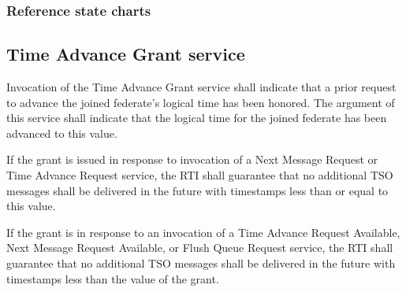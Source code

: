 \begin{compactstdpage}
    \subsubsection{Reference state charts}


    \subsection{Time Advance Grant \rtiinitiated{} service}

    Invocation of the Time Advance Grant \rtiinitiated{} service shall indicate that a prior request to advance the joined federate's logical time has been honored. The argument of this service shall indicate that the logical time for the joined federate has been advanced to this value.

    If the grant is issued in response to invocation of a Next Message Request or Time Advance Request service, the RTI shall guarantee that no additional TSO messages shall be delivered in the future with timestamps less than or equal to this value.

    If the grant is in response to an invocation of a Time Advance Request Available, Next Message Request Available, or Flush Queue Request service, the RTI shall guarantee that no additional TSO messages shall be delivered in the future with timestamps less than the value of the grant.


\end{compactstdpage}

\clearpage

